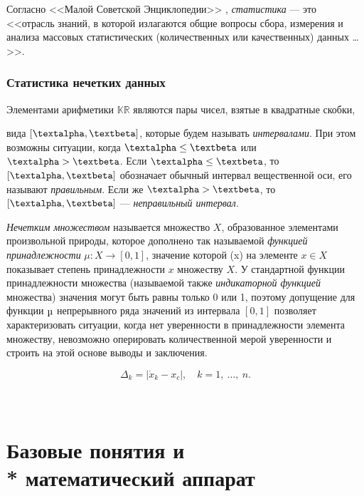 \documentclass[a5paper,openany]{book}
\newcommand{\mbb}{\mathbb}
\begin{document}
Согласно <<Малой Советской Энциклопедии>> \cite{MalSovEncycl},  \emph{статистика} 
--- это <<отрасль знаний, в которой излагаются общие вопросы сбора, измерения и 
анализа массовых статистических (количественных или качественных) данных \ldots>>. 

\subsection{Статистика нечетких данных} 
\label{FuzzyStatSect} 


Элементами арифметики $\mbb{KR}$ являются пары чисел, взятые в квадратные скобки,  \text{\textalpha}

вида $[\text{\textalpha}, \beta]$, которые будем называть \textit{интервалами}. 
При этом возможны ситуации, когда $\text{\textalpha}\leq\beta$ или $\text{\textalpha} > \beta$. Если 
$\text{\textalpha}\leq \beta$, то $[\text{\textalpha}, \beta]$ обозначает обычный интервал вещественной оси, 
его называют \textit{правильным}. Если же $\text{\textalpha} >  \beta$, то $[\text{\textalpha}, \beta]$ 
--- \textit{неправильный интервал}. 


\emph{Нечетким множеством} %
называется множество $X$, 
образованное элементами произвольной природы, которое дополнено так называемой 
\emph{функцией принадлежности} $\mu: X\to[0, 1]$, значение которой \textmu(x) на элементе 
$x\in X$ показывает степень принадлежности $x$ множеству $X$. 
У стандартной функции принадлежности множества (называемой также \emph{индикаторной функцией} 
множества) значения могут быть равны только 0 или 1, поэтому допущение для функции $\text{\textmu}$ 
непрерывного ряда значений из интервала $[0, 1]$ позволяет характеризовать ситуации, когда 
нет уверенности в принадлежности элемента множеству, невозможно оперировать количественной мерой   
уверенности и строить на этой основе  выводы и заключения.

\begin{equation}
	\label{MeasurDiffsAbs} 
	\Delta_k = | \mathring{x}_k  - x_c |,  \quad  k = 1, \ \ldots, \ n.  
\end{equation}  


\chapter[Базовые понятия и математический аппарат]%
{\\Базовые понятия и \\* математический аппарат} 
\label{PrimaryConceptChap} 
\end{document}
